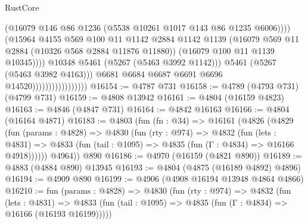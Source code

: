 \begin{lexlean}{RustCore}
\begin{coremodule}
                                                  (@16079
                                                    @146
                                                    @86
                                                    @1236
                                                    (@5538 @10261 @1017 @143 @86 @1235 @6006))))
                                              (@15964
                                                @4155
                                                @569
                                                @100
                                                @11
                                                @1142
                                                @2884
                                                @1142
                                                @1139
                                                (@16079
                                                  @569
                                                  @11
                                                  @2884
                                                  (@10326 @568 @2884 @11876 @11880))
                                                (@16079 @100 @11 @1139 @10345))))
                                          @10348
                                          @5461
                                          (@5267 (@5463 @3992 @1142)))
                                        @5461
                                        (@5267 (@5463 @3982 @4163)))
                                      @6681
                                      @6684
                                      @6687
                                      @6691
                                      @6696
                                      @14520)))))))))))))))))
@16154 := @4787 @731
@16158 := @4789 (@4793 @731) (@4799 @731)
@16159 := @4808 @13942
@16161 := @4804 (@16159 @4823)
@16163 := @4846 (@4847 @731)
@16164 := @4842 @16163
@16166 := @4804 (@16164 @4871)
@16183 := @4803
    (fun (fn : @34) =>
    @16161
      (@4826
        (@4829
          (fun (params : @4828) =>
          @4830
            (fun (rty : @974) =>
            @4832
              (fun (lets : @4831) =>
              @4833 (fun (tail : @1095) => @4835 (fun (Γ : @4834) => @16166 @4918))))))
        @4964))
    @890
@16186 := @4970 (@16159 (@4821 @890))
@16189 := @4883 (@4884 @890) @13945
@16193 := @4804 (@4875 (@16189 @4892) @4896)
@16194 := @4909 @890
@16199 := @4906 (@4908 @16194 @13948 @4864 @4866)
@16210 := fun (params : @4828) =>
  @4830
    (fun (rty : @974) =>
    @4832
      (fun (lets : @4831) =>
      @4833 (fun (tail : @1095) => @4835 (fun (Γ : @4834) => @16166 (@16193 @16199)))))

\end{coremodule}
\end{lexlean}
